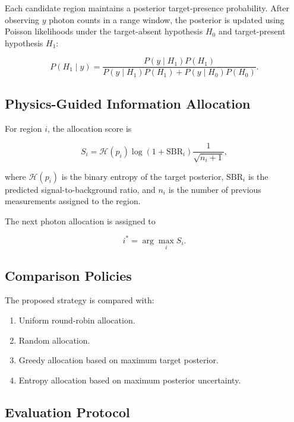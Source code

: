 Each candidate region maintains a posterior target-presence probability. After observing $y$ photon counts in a range window, the posterior is updated using Poisson likelihoods under the target-absent hypothesis $H_0$ and target-present hypothesis $H_1$:

\begin{equation}
P(H_1 \mid y) =
\frac{
P(y \mid H_1)P(H_1)
}{
P(y \mid H_1)P(H_1)
+
P(y \mid H_0)P(H_0)
}.
\end{equation}

\subsection{Physics-Guided Information Allocation}

For region $i$, the allocation score is

\begin{equation}
S_i =
\mathcal{H}(p_i)
\log\left(1+\mathrm{SBR}_i\right)
\frac{1}{\sqrt{n_i+1}},
\end{equation}

where $\mathcal{H}(p_i)$ is the binary entropy of the target posterior, $\mathrm{SBR}_i$ is the predicted signal-to-background ratio, and $n_i$ is the number of previous measurements assigned to the region.

The next photon allocation is assigned to

\begin{equation}
i^{*} = \arg\max_i S_i.
\end{equation}

\subsection{Comparison Policies}

The proposed strategy is compared with:

\begin{enumerate}
    \item Uniform round-robin allocation.
    \item Random allocation.
    \item Greedy allocation based on maximum target posterior.
    \item Entropy allocation based on maximum posterior uncertainty.
\end{enumerate}

\subsection{Evaluation Protocol}

